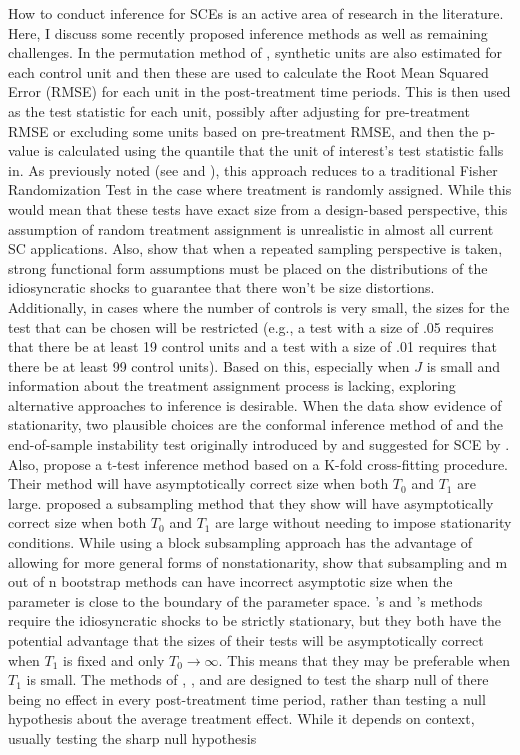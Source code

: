 \documentclass{article}
\begin{document}
How to conduct inference for SCEs is an active area of research in the literature. Here, I discuss some recently proposed inference methods as well as remaining challenges. In the permutation method of \cite{Abadie2010}, synthetic units are also estimated for each control unit and then these are used to calculate the Root Mean Squared Error (RMSE) for each unit in the post-treatment time periods. This is then used as the test statistic for each unit, possibly after adjusting for pre-treatment RMSE or excluding some units based on pre-treatment RMSE, and then the p-value is calculated using the quantile that the unit of interest's test statistic falls in. As previously noted (see \cite{Abadie2010} and \cite{Abadie2015}), this approach reduces to a traditional Fisher Randomization Test in the case where treatment is randomly assigned. While this would mean that these tests have exact size from a design-based perspective, this assumption of random treatment assignment is unrealistic in almost all current SC applications. Also, \cite{SCandInference} show that when a repeated sampling perspective is taken, strong functional form assumptions must be placed on the distributions of the idiosyncratic shocks to guarantee that there won't be size distortions. Additionally, in cases where the number of controls is very small, the sizes for the test that can be chosen will be restricted (e.g., a test with a size of .05 requires that there be at least 19 control units and a test with a size of .01 requires that there be at least 99 control units). Based on this, especially when $J$ is small and information about the treatment assignment process is lacking, exploring alternative approaches to inference is desirable. When the data show evidence of stationarity, two plausible choices are the conformal inference method of \cite{ConformalInference} and the end-of-sample instability test originally introduced by \cite{Andrews2003} and suggested for SCE by \cite{SCandInference}. Also, \cite{t-test2022} propose a t-test inference method based on a K-fold cross-fitting procedure. Their method will have asymptotically correct size when both $T_0$ and $T_1$ are large. \cite{Li2020} proposed a subsampling method that they show will have asymptotically correct size when both $T_0$ and $T_1$ are large without needing to impose stationarity conditions. While using a block subsampling approach has the advantage of allowing for more general forms of nonstationarity, \cite{ProblemWithSubampling} show that subsampling and m out of n bootstrap methods can have incorrect asymptotic size when the parameter is close to the boundary of the parameter space. \cite{ConformalInference}'s and \cite{Andrews2003}'s methods require the idiosyncratic shocks to be strictly stationary, but they both have the potential advantage that the sizes of their tests will be asymptotically correct when $T_1$ is fixed and only $T_0 \rightarrow \infty$. This means that they may be preferable when $T_1$ is small. The methods of \cite{Abadie2010}, \cite{ConformalInference}, and \cite{Andrews2003} are designed to test the sharp null of there being no effect in every post-treatment time period, rather than testing a null hypothesis about the average treatment effect. While it depends on context, usually testing the sharp null hypothesis 
\end{document}
